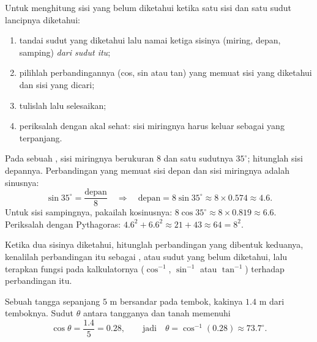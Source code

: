 \begin{method}\label{met:g9:trig:side}
Untuk menghitung sisi yang belum diketahui ketika satu sisi dan satu
sudut lancipnya diketahui:
\begin{enumerate}
  \item tandai sudut yang diketahui lalu namai ketiga sisinya (miring,
        depan, samping) \emph{dari sudut itu};
  \item pilihlah perbandingannya (cos, sin atau tan) yang memuat sisi
        yang diketahui dan sisi yang dicari;
  \item tulislah  lalu selesaikan;
  \item periksalah dengan akal sehat: sisi miringnya harus keluar
        sebagai yang terpanjang.
\end{enumerate}
\end{method}

\begin{example}\label{ex:g9:trig:side}
Pada sebuah , sisi miringnya berukuran $8$ dan satu
sudutnya $35^\circ$; hitunglah sisi depannya. Perbandingan yang memuat
sisi depan dan sisi miringnya adalah sinusnya:
\[
\sin 35^\circ = \frac{\text{depan}}{8}
\quad\Longrightarrow\quad
\text{depan} = 8 \sin 35^\circ \approx 8 \times 0.574 \approx 4.6 .
\]
Untuk sisi sampingnya, pakailah kosinusnya:
$8\cos 35^\circ \approx 8 \times 0.819 \approx 6.6$. Periksalah dengan
Pythagoras: $4.6^2 + 6.6^2 \approx 21 + 43 \approx 64 = 8^2$.
\end{example}

\begin{method}\label{met:g9:trig:angle}
Ketika dua sisinya diketahui, hitunglah perbandingan yang dibentuk
keduanya, kenalilah perbandingan itu sebagai ,  atau 
sudut yang belum diketahui, lalu terapkan fungsi  pada
kalkulatornya ($\cos^{-1}$, $\sin^{-1}$ atau $\tan^{-1}$) terhadap
perbandingan itu.
\end{method}

\begin{example}\label{ex:g9:trig:angle}
Sebuah tangga sepanjang $5$ m bersandar pada tembok, kakinya $1.4$ m
dari temboknya. Sudut $\theta$ antara tangganya dan tanah memenuhi
\[
\cos\theta = \frac{1.4}{5} = 0.28,
\qquad\text{jadi}\quad
\theta = \cos^{-1}(0.28) \approx 73.7^\circ .
\]
\end{example}

